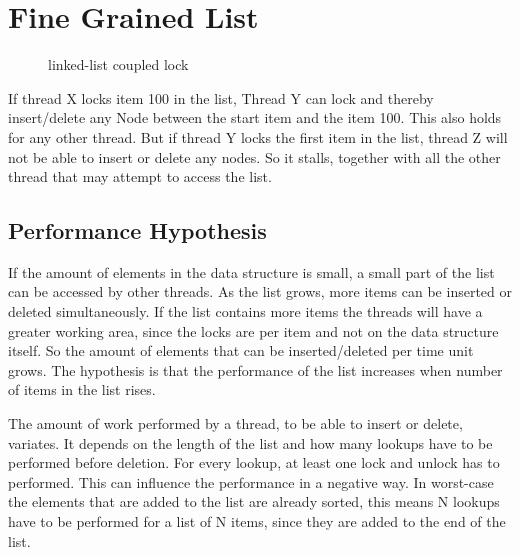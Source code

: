 \documentclass[10pt,a4paper]{article}
\begin{document}
\section{Fine Grained List}
\begin{figure}[h]
\centerline{
}
\caption{linked-list coupled lock}
\end{figure}

If thread X locks item 100 in the list, Thread Y can lock and thereby
insert/delete any Node between the start item and the item 100. This
also holds for any other thread. But if thread Y locks the first item in the
list, thread Z will not be able to insert or delete any nodes. So it stalls,
together with all the other thread that may attempt to access the list.

\subsection{Performance Hypothesis}
If the amount of elements in the data structure is small, a small part of the
list can be accessed by other threads. As the list grows, more items can be 
inserted or deleted simultaneously. If the list contains more items the threads
will have a greater working area, since the locks are per item and not on the
data structure itself. So the amount of elements that can be inserted/deleted 
per time unit grows.
The hypothesis is that the performance of the list increases when number of
items in the list rises.

The amount of work performed by a thread, to be able to insert or delete, variates.
It depends on the length of the list and how many lookups have to be performed
before deletion. For every lookup, at least one lock and unlock has to performed. This can
influence the performance in a negative way. In worst-case the elements that
are added to the list are already sorted, this means N lookups have to be
performed for a list of N items, since they are added to the end of the list.
\end{document}
